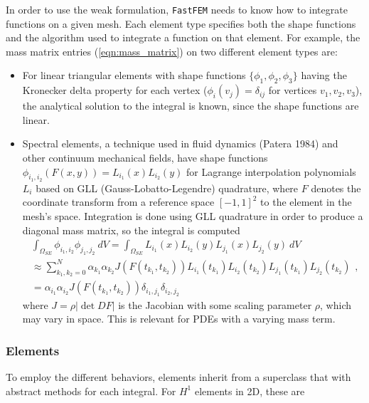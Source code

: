 In order to use the weak formulation, \texttt{FastFEM} needs to know how to integrate functions on a given mesh. Each element type specifies both the shape functions and the algorithm used to integrate a function on that element. For example, the mass matrix entries (\ref{eqn:mass_matrix}) on two different element types are:

\begin{itemize}
\item For linear triangular elements with shape functions $\{\phi_1,\phi_2,\phi_3\}$ having the Kronecker delta property for each vertex ($\phi_i(v_j) = \delta_{ij}$ for vertices $v_1,v_2,v_3$), the analytical solution to the integral is known, since the shape functions are linear.

\item Spectral elements, a technique used in fluid dynamics (Patera 1984)\supercite{Patera1984} and other continuum mechanical fields, have shape functions $\phi_{i_1,i_2}(F(x,y)) = L_{i_1}(x)L_{i_2}(y)$ for Lagrange interpolation polynomials $L_i$ based on GLL (Gauss-Lobatto-Legendre) quadrature\supercite{Quarteroni2007}, where $F$ denotes the coordinate transform from a reference space $[-1,1]^2$ to the element in the mesh's space. Integration is done using GLL quadrature in order to produce a diagonal mass matrix, so the integral is computed
\begin{equation}
\begin{aligned}
    \int_{\Omega_{SE}} \phi_{i_1,i_2}\phi_{j_1,j_2} ~dV = \int_{\Omega_{SE}} L_{i_1}(x)L_{i_2}(y)L_{j_1}(x)L_{j_2}(y) ~dV \\
    \approx \sum_{k_1,k_2=0}^N \alpha_{k_1}\alpha_{k_2} J(F(t_{k_1},t_{k_2}))L_{i_1}(t_{k_1})L_{i_2}(t_{k_2})L_{j_1}(t_{k_1})L_{j_2}(t_{k_2}) \\
    = \alpha_{i_1}\alpha_{i_2}J(F(t_{k_1},t_{k_2}))\delta_{i_1,j_1}\delta_{i_2,j_2}
\end{aligned},
\label{eqn:spectral_mass_matrix}
\end{equation}
where $J = \rho|\det DF|$ is the Jacobian with some scaling parameter $\rho$, which may vary in space. This is relevant for PDEs with a varying mass term.
\end{itemize}


\subsubsection{Elements} \label{sec:elem_field:elements}
To employ the different behaviors, elements inherit from a superclass that with abstract methods for each integral. For $H^1$ elements in 2D, these are


